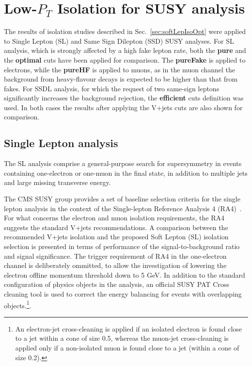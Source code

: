 \section{Low-$P_T$ Isolation for SUSY analysis}
The results of isolation studies described in Sec.~\ref{sec:softLepIsoOpt} were applied to
Single Lepton (SL) and Same Sign Dilepton (SSD) SUSY analyses.
For SL analysis, which is strongly affected by a high fake lepton rate, both the
{\bf pure} and the {\bf optimal} cuts have been applied for comparison. The {\bf pureFake} is applied to electrons, while the {\bf pureHF} is applied to muons, as in the muon channel the background from heavy-flavour decays is expected to be higher than that from fakes.
For SSDL analysis, for which the request of two same-sign leptons significantly increases  the background
rejection, the {\bf efficient} cuts definition was used. In both cases the results 
after applying the V+jets cuts are also shown for comparison.


\subsection{Single Lepton analysis}

The SL analysis comprise a general-purpose search for supersymmetry in events containing one-electron or one-muon in the final state, in addition to multiple jets and large missing transverse energy.

The CMS SUSY group provides a set of baseline selection criteria for the single lepton analysis in the context of the Single-lepton Reference Analysis 4 (RA4)~\cite{RA4page}. For what concerns the electron and muon isolation requirements, the RA4 suggests the standard V+jets recommendations. A comparison between the recommended V+jets isolation and the proposed Soft Lepton (SL) isolation selection is presented in terms of performance of the signal-to-background ratio and signal significance. 
 The trigger requirement of RA4 in the one-electron channel is deliberately ommitted, to allow the investigation of lowering the electron offline momentum threshold down to 5 GeV. In addition to the standard configuration of physics objects in the analysis, an official SUSY PAT Cross cleaning tool is used to correct the energy balancing for events with overlapping objects.\footnote{An electron-jet cross-cleaning is applied if an isolated electron is found close to a jet within a cone of size 0.5, whereas the muon-jet cross-cleaning is applied only if a non-isolated muon is found close to a jet (within a cone of size 0.2).}. 
 

